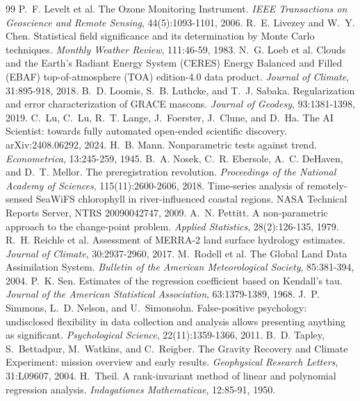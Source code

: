 \documentclass[11pt,a4paper]{article}
\begin{document}
\begin{thebibliography}{99}
 P.~F. Levelt et al. The Ozone Monitoring Instrument. \emph{IEEE Transactions on Geoscience and
  Remote Sensing}, 44(5):1093-1101, 2006.
 R.~E. Livezey and W.~Y. Chen. Statistical field significance and its determination by Monte Carlo
  techniques. \emph{Monthly Weather Review}, 111:46-59, 1983.
 N.~G. Loeb et al. Clouds and the Earth's Radiant Energy System (CERES) Energy Balanced and Filled
  (EBAF) top-of-atmosphere (TOA) edition-4.0 data product. \emph{Journal of Climate}, 31:895-918, 2018.
 B.~D. Loomis, S.~B. Luthcke, and T.~J. Sabaka. Regularization and error characterization of GRACE
  mascons. \emph{Journal of Geodesy}, 93:1381-1398, 2019.
 C.~Lu, C.~Lu, R.~T. Lange, J.~Foerster, J.~Clune, and D.~Ha. The AI Scientist: towards fully automated
  open-ended scientific discovery. arXiv:2408.06292, 2024.
 H.~B. Mann. Nonparametric tests against trend. \emph{Econometrica}, 13:245-259, 1945.
 B.~A. Nosek, C.~R. Ebersole, A.~C. DeHaven, and D.~T. Mellor. The preregistration revolution.
  \emph{Proceedings of the National Academy of Sciences}, 115(11):2600-2606, 2018.
 Time-series analysis of remotely-sensed SeaWiFS chlorophyll in river-influenced coastal regions.
  NASA Technical Reports Server, NTRS 20090042747, 2009.
 A.~N. Pettitt. A non-parametric approach to the change-point problem. \emph{Applied
  Statistics}, 28(2):126-135, 1979.
 R.~H. Reichle et al. Assessment of MERRA-2 land surface hydrology estimates. \emph{Journal of
  Climate}, 30:2937-2960, 2017.
 M.~Rodell et al. The Global Land Data Assimilation System. \emph{Bulletin of the American
  Meteorological Society}, 85:381-394, 2004.
 P.~K. Sen. Estimates of the regression coefficient based on Kendall's tau. \emph{Journal of the
  American Statistical Association}, 63:1379-1389, 1968.
 J.~P. Simmons, L.~D. Nelson, and U.~Simonsohn. False-positive psychology: undisclosed flexibility
  in data collection and analysis allows presenting anything as significant. \emph{Psychological Science},
  22(11):1359-1366, 2011.
 B.~D. Tapley, S.~Bettadpur, M.~Watkins, and C.~Reigber. The Gravity Recovery and Climate
  Experiment: mission overview and early results. \emph{Geophysical Research Letters}, 31:L09607, 2004.
 H.~Theil. A rank-invariant method of linear and polynomial regression analysis.
  \emph{Indagationes Mathematicae}, 12:85-91, 1950.

\end{thebibliography}
\end{document}
